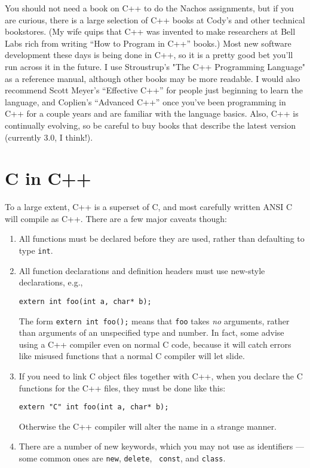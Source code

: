 You should not need a book on C++ to do the Nachos assignments, but if 
you are curious, there is a large selection of C++ books
at Cody's and other technical bookstores. (My wife quips that C++ was
invented to make researchers at Bell Labs rich from writing
``How to Program in C++'' books.)   Most new software development
these days is being done in C++, so it is a pretty good bet you'll 
run across it in the future.  I use Stroustrup's "The C++
Programming Language" as a reference manual, although other 
books may be more readable.  I would also recommend Scott Meyer's
``Effective C++'' for people just beginning to learn the language,
and Coplien's ``Advanced C++'' once you've been programming in C++ 
for a couple years and are familiar with the language basics.
Also, C++ is continually evolving, so be careful to buy books that describe
the latest version (currently 3.0, I think!).

\section{C in C++}

To a large extent, C++ is a superset of C, and most carefully written
ANSI C will compile as C++.  There are a few major caveats though:

\begin{enumerate}

\item All functions must be declared before they are used, rather than
defaulting to type {\tt int}.

\item All function declarations and definition headers must use
new-style declarations, e.g.,

\begin{verbatim}
extern int foo(int a, char* b);
\end{verbatim}

The form {\tt extern int foo();} means that {\tt foo} takes {\it no}
arguments, rather than arguments of an unspecified type and number.
In fact, some advise using a C++ compiler even
on normal C code, because it will catch errors like misused functions that
a normal C compiler will let slide.

\item If you need to link C object files together with C++, when you
declare the C functions for the C++ files, they must be done like this:

\begin{verbatim}
extern "C" int foo(int a, char* b);
\end{verbatim}

Otherwise the C++ compiler will alter the name in a strange manner.

\item There are a number of new keywords, which you may not use as
identifiers --- some common ones are {\tt new}, {\tt delete}, {\tt
const}, and {\tt class}.

\end{enumerate}

